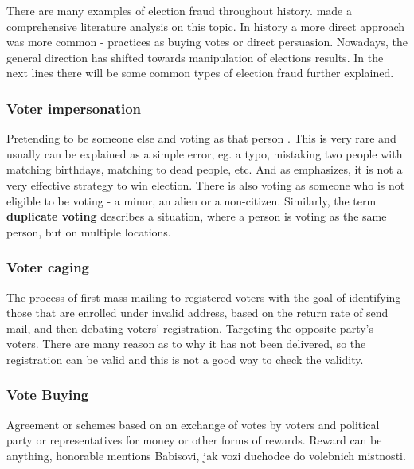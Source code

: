 
There are many examples of election fraud throughout history. \citeauthor{Lehoucq2003} made a comprehensive literature analysis on this topic. In history a more direct approach was more common - practices as buying votes or direct persuasion. Nowadays, the general direction has shifted towards manipulation of elections results. In the next lines there will be some common types of election fraud further explained. \cite{Levitt2007} 

\subsubsection*{Voter impersonation} 
Pretending to be someone else and voting as that person . This is very rare and usually can be explained as a simple error, eg. a typo, mistaking two people with matching birthdays, matching to dead people, etc. And as \citeauthor{Levitt2007} emphasizes, it is not a very effective strategy to win election. There is also voting as someone who is not eligible to be voting - a minor, an alien or a non-citizen. Similarly, the term \textbf{duplicate voting} describes a situation, where a person is voting as the same person, but on multiple locations. \cite{The_Heritage_Foundation_2024}

\subsubsection*{Voter caging} %
The process of first mass mailing to registered voters with the goal of identifying those that are enrolled under invalid address, based on the return rate of send mail, and then debating voters' registration. Targeting the opposite party's voters. There are many reason as to why it has not been delivered, so the registration can be valid and this is not a good way to check the validity. \cite{Levitt2007}

\subsubsection*{Vote Buying} 
Agreement or schemes based on an exchange of votes by voters and political party or representatives for money or other forms of rewards. Reward can be anything, honorable mentions Babisovi, jak vozi duchodce do volebnich mistnosti. \cite{Lebeda2021, Levitt2007, The_Heritage_Foundation_2024}

